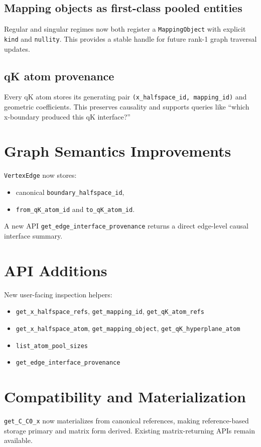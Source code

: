 \documentclass[11pt]{article}
\begin{document}
\subsection{Mapping objects as first-class pooled entities}
Regular and singular regimes now both register a \texttt{MappingObject} with explicit \texttt{kind} and \texttt{nullity}. This provides a stable handle for future rank-1 graph traversal updates.

\subsection{qK atom provenance}
Every qK atom stores its generating pair \texttt{(x\_halfspace\_id, mapping\_id)} and geometric coefficients. This preserves causality and supports queries like ``which x-boundary produced this qK interface?''

\section{Graph Semantics Improvements}
\texttt{VertexEdge} now stores:
\begin{itemize}
\item canonical \texttt{boundary\_halfspace\_id},
\item \texttt{from\_qK\_atom\_id} and \texttt{to\_qK\_atom\_id}.
\end{itemize}
A new API \texttt{get\_edge\_interface\_provenance} returns a direct edge-level causal interface summary.

\section{API Additions}
New user-facing inspection helpers:
\begin{itemize}
\item \texttt{get\_x\_halfspace\_refs}, \texttt{get\_mapping\_id}, \texttt{get\_qK\_atom\_refs}
\item \texttt{get\_x\_halfspace\_atom}, \texttt{get\_mapping\_object}, \texttt{get\_qK\_hyperplane\_atom}
\item \texttt{list\_atom\_pool\_sizes}
\item \texttt{get\_edge\_interface\_provenance}
\end{itemize}

\section{Compatibility and Materialization}
\texttt{get\_C\_C0\_x} now materializes from canonical references, making reference-based storage primary and matrix form derived. Existing matrix-returning APIs remain available.
\end{document}
